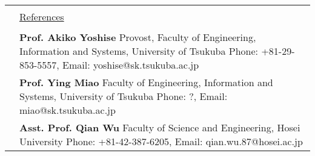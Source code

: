 \documentclass[11pt]{article}
\newcommand{\headingfont}{\LARGE \MakeUppercase }
\newenvironment{SectionTable}[1]{
	\renewcommand*{\arraystretch}{1.0}
	\setlength{\tabcolsep}{10pt}
	\begin{longtable}{Rp{5.7in}} 
		\rule{2.5cm}{4pt} 
		& \underline{#1} \\ %
	}
	{
	\end{longtable}\vspace{-.3cm}
}
\begin{document}
\begin{SectionTable}{\headingfont References}
	&
	\textbf{Prof. Akiko Yoshise} \newline
	Provost, Faculty of Engineering, Information and Systems, University of Tsukuba \newline 
	Phone: +81-29-853-5557, Email: yoshise@sk.tsukuba.ac.jp \\
	
	& 
	\textbf{Prof. Ying Miao} \newline
	Faculty of Engineering, Information and Systems, University of Tsukuba \newline 
	Phone: ?, Email: miao@sk.tsukuba.ac.jp\\
	
	& 
	\textbf{Asst. Prof. Qian Wu} \newline
	Faculty of Science and Engineering, Hosei University \newline 
	Phone: +81-42-387-6205, Email: qian.wu.87@hosei.ac.jp \\
\end{SectionTable}
	

\label{LastPage}  %
\end{document}
